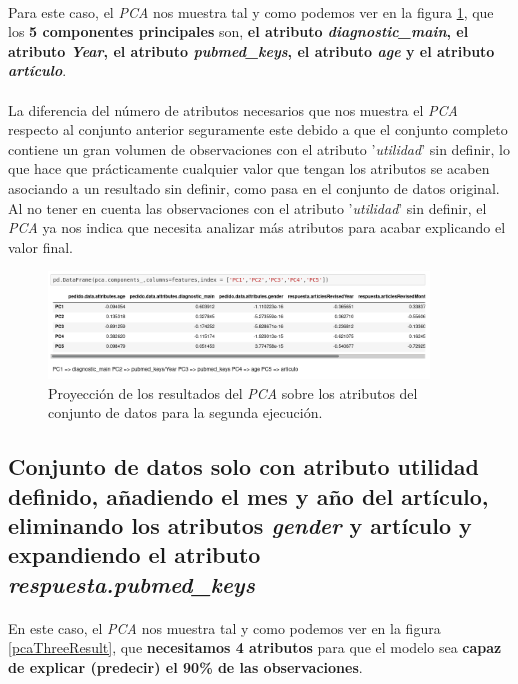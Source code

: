 \paragraph{}
Para este caso, el \textit{PCA} nos muestra tal y como podemos ver en la figura \ref{pcaTwoAtributos}, que los \textbf{5 componentes principales} son, \textbf{el atributo \textit{diagnostic\_main}, el atributo \textit{Year}, el atributo \textit{pubmed\_keys}, el atributo \textit{age} y el atributo \textit{artículo}}.

\paragraph{}
La diferencia del número de atributos necesarios que nos muestra el \textit{PCA} respecto al conjunto anterior seguramente este debido a que el conjunto completo contiene un gran volumen de observaciones con el atributo '\textit{utilidad}' sin definir, lo que hace que prácticamente cualquier valor que tengan los atributos se acaben asociando a un resultado sin definir, como pasa en el conjunto de datos original. Al no tener en cuenta las observaciones con el atributo '\textit{utilidad}' sin definir, el \textit{PCA} ya nos indica que necesita analizar más atributos para acabar explicando el valor final.

\begin{figure}[!htb]
  \centering
    \includegraphics[width=0.9\textwidth]{images/resultados_procesado_de_datos_pca2_atributos.png}
    \caption{Proyección de los resultados del \textit{PCA} sobre los atributos del conjunto de datos para la segunda ejecución.}
  \label{pcaTwoAtributos}
\end{figure}

\subsection{Conjunto de datos solo con atributo utilidad definido, añadiendo el mes y año del artículo, eliminando los atributos \textit{gender} y artículo y expandiendo el atributo \textit{respuesta.pubmed\_keys}}
\label{result:pca_case3}
\paragraph{}
En este caso, el \textit{PCA} nos muestra tal y como podemos ver en la figura \ref{pcaThreeResult}, que \textbf{necesitamos 4 atributos} para que el modelo sea \textbf{capaz de explicar (predecir) el 90\% de las observaciones}.

